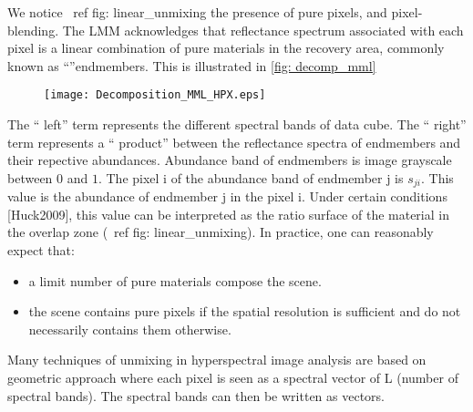 We notice \ ref {fig:} linear_unmixing the
presence of pure pixels, and pixel-blending. The LMM acknowledges that
reflectance spectrum associated with each pixel is a linear combination of pure materials in the recovery area, commonly known as ``''endmembers. This is illustrated in \ref{fig: decomp_mml}

\begin{figure}[h]
  \centering
  \texttt{[image: Decomposition\_MML\_HPX.eps]}
  \label{fig:decomp_mml}
\end{figure}
The `` left'' term represents the different spectral bands of
data cube. The `` right'' term represents a `` product''
between the reflectance spectra of endmembers and their repective abundances. Abundance band of endmembers is
image grayscale between $0$ and $1$. The pixel i of the
abundance band of endmember j is $s_ {ji}$. This value is the
abundance of endmember j in the pixel i. Under certain conditions
[Huck2009], this value can be interpreted as the ratio
surface of the material in the overlap zone (\ ref {fig: linear_unmixing}). In
practice, one can reasonably expect that: 

\begin{itemize}
\item{a limit number
of pure materials compose the scene.}
\item{the scene contains pure pixels if the spatial resolution is sufficient and
do not necessarily contains them otherwise.}
\end{itemize}

Many techniques of unmixing in hyperspectral image analysis
are based on geometric approach where each pixel is seen as a spectral
vector of L (number of spectral bands). The
spectral bands can then be written as vectors.

\begin{figure}[h]
\label{fig:mml}
\end{figure}


